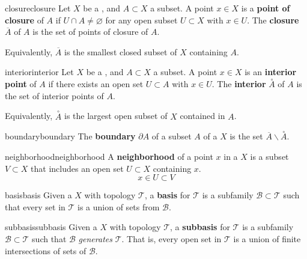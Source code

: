 \begin{topic}{closure}{closure}
    Let $X$ be a , and $A \subset X$ a subset. A point $x \in X$ is a \textbf{point of closure} of $A$ if $U \cap A \ne \varnothing$ for any open subset $U \subset X$ with $x \in U$. The \textbf{closure} $\overline{A}$ of $A$ is the set of points of closure of $A$.
    
    Equivalently, $\overline{A}$ is the smallest closed subset of $X$ containing $A$.
\end{topic}

\begin{topic}{interior}{interior}
    Let $X$ be a , and $A \subset X$ a subset. A point $x \in X$ is an \textbf{interior point} of $A$ if there exists an open set $U \subset A$ with $x \in U$. The \textbf{interior} $\overset{\circ}{A}$ of $A$ is the set of interior points of $A$.
    
    Equivalently, $\overset{\circ}{A}$ is the largest open subset of $X$ contained in $A$.
\end{topic}

\begin{topic}{boundary}{boundary}
    The \textbf{boundary} $\partial A$ of a subset $A$ of a  $X$ is the set $\overline{A} \backslash \overset{\circ}{A}$.
\end{topic}

\begin{topic}{neighborhood}{neighborhood}
    A \textbf{neighborhood} of a point $x$ in a  $X$ is a subset $V \subset X$ that includes an open set $U \subset X$ containing $x$.
    \[ x \in U \subset V \]
\end{topic}

\begin{topic}{basis}{basis}
    Given a  $X$ with topology $\mathcal{T}$, a \textbf{basis} for $\mathcal{T}$ is a subfamily $\mathcal{B} \subset \mathcal{T}$ such that every set in $\mathcal{T}$ is a union of sets from $\mathcal{B}$.
\end{topic}

\begin{topic}{subbasis}{subbasis}
    Given a  $X$ with topology $\mathcal{T}$, a \textbf{subbasis} for $\mathcal{T}$ is a subfamily $\mathcal{B} \subset \mathcal{T}$ such that $\mathcal{B}$ \textit{generates} $\mathcal{T}$. That is, every open set in $\mathcal{T}$ is a union of finite intersections of sets of $\mathcal{B}$.
\end{topic}

